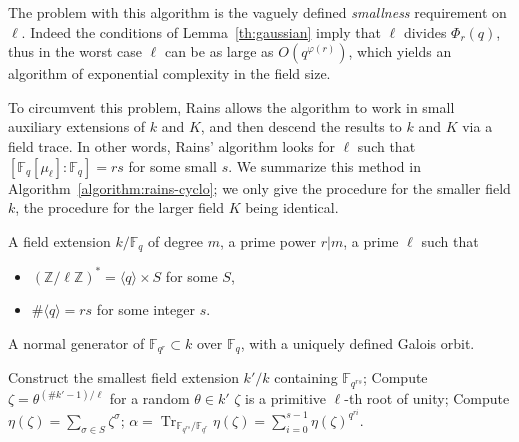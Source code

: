 \documentclass[12pt]{article}
\theoremstyle{plain}
\theoremstyle{definition}
\DeclareMathOperator{\trace}{Tr} %
\def\Z{\ensuremath{\mathbb{Z}}}
\def\F{\ensuremath{\mathbb{F}}}
\def\euler{\ensuremath{\varphi}}
\newcounter{algorithm}
\begin{document}
The problem with this algorithm is the vaguely defined
\emph{smallness} requirement on $\ell$. Indeed the conditions of
Lemma~\ref{th:gaussian} imply that $\ell$ divides $\Phi_r(q)$, thus in
the worst case $\ell$ can be as large as $O(q^{\euler(r)})$, which
yields an algorithm of exponential complexity in the field size.

To circumvent this problem, Rains allows the algorithm to work in
small auxiliary extensions of $k$ and $K$, and then descend the
results to $k$ and $K$ via a field trace. In other words, Rains'
algorithm looks for $\ell$ such that $[\F_q[\mu_\ell]:\F_q]=rs$ for
some small $s$. We summarize this method in
Algorithm~\ref{algorithm:rains-cyclo}; we only give the procedure for
the smaller field $k$, the procedure for the larger field $K$ being
identical.

\begin{algorithm}
  \label{algorithm:rains-cyclo}
  \begin{algorithmic}[1]
    \REQUIRE A field extension $k/\F_q$ of degree $m$, a prime power
    $r|m$, a prime $\ell$ such that
    \begin{itemize}
    \item $(\Z/\ell\Z)^\ast = \langle q\rangle \times S$ for some $S$,
    \item $\#\langle q\rangle = rs$ for some integer $s$.
    \end{itemize}
    \ENSURE A normal generator of $\F_{q^r}\subset k$ over $\F_q$,
    with a uniquely defined Galois orbit.
    
    \STATE Construct the smallest field extension $k'/k$
    containing $\F_{q^{rs}}$; 
    \REPEAT
    \STATE Compute $\zeta = \theta^{(\#k'-1)/\ell}$ for a random $\theta\in k'$
    \UNTIL $\zeta$ is a primitive $\ell$-th root of unity;
    \STATE\label{algorithm:rains-cyclo:period} Compute $\eta(\zeta) = \sum_{\sigma\in S}\zeta^\sigma$;
    \RETURN\label{algorithm:rains-cyclo:trace} $\alpha = \trace_{\F_{q^{rs}}/\F_{q^r}}\eta(\zeta) = \sum_{i=0}^{s-1}\eta(\zeta)^{q^{ri}}$.
  \end{algorithmic}
\end{algorithm}
\end{document}
